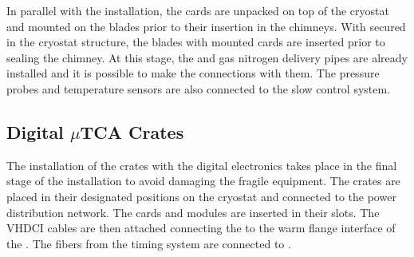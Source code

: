 In parallel with the  installation, the  cards are unpacked on top of the cryostat and mounted on the blades prior to their insertion in the chimneys.  
With  secured in the cryostat structure, the blades with mounted  cards %
are inserted prior to sealing the chimney.
At this stage, the \lar and gas nitrogen delivery pipes are already installed and  
it is possible to make the connections with them. The pressure probes and temperature sensors are also connected to the slow control system.
 
 
\subsection{Digital $\mu$TCA Crates}
\label{sec:fddp-tpc-elec-install-utca}

The installation of the  crates with the digital electronics %
takes place in the final stage of the  installation to avoid damaging the fragile equipment. The crates are placed in their designated positions on the cryostat and connected to the power distribution network. The  cards and  modules are inserted in their slots. The VHDCI cables are then attached connecting the   to the warm flange interface of the .  The fibers from the timing system are connected to . 



